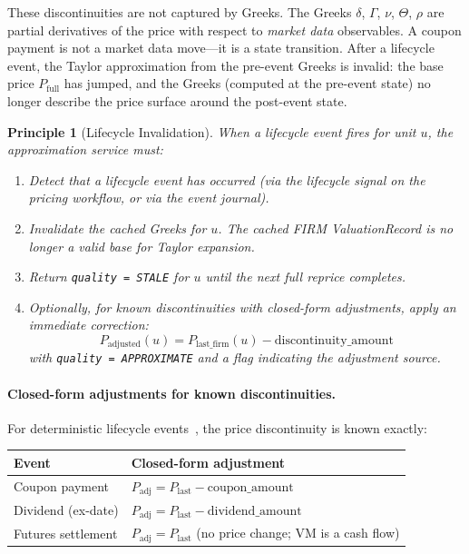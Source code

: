 \documentclass[11pt,a4paper]{article}
\newtheorem{principle}[definition]{Principle}
\begin{document}
\noindent These discontinuities are not captured by Greeks.  The Greeks $\delta$, $\Gamma$, $\nu$, $\Theta$, $\rho$ are partial derivatives of the price with respect to \emph{market data} observables.  A coupon payment is not a market data move---it is a state transition.  After a lifecycle event, the Taylor approximation from the pre-event Greeks is invalid: the base price $P_{\mathrm{full}}$ has jumped, and the Greeks (computed at the pre-event state) no longer describe the price surface around the post-event state.

\begin{principle}[Lifecycle Invalidation]
\label{princ:lifecycle-invalidation}
When a lifecycle event fires for unit $u$, the approximation service must:
\begin{enumerate}[nosep]
\item Detect that a lifecycle event has occurred (via the lifecycle signal on the pricing workflow, or via the event journal).
\item Invalidate the cached Greeks for $u$.  The cached FIRM ValuationRecord is no longer a valid base for Taylor expansion.
\item Return \texttt{quality = STALE} for $u$ until the next full reprice completes.
\item Optionally, for known discontinuities with closed-form adjustments, apply an immediate correction:
\[
P_{\mathrm{adjusted}}(u) = P_{\mathrm{last\_firm}}(u) - \mathrm{discontinuity\_amount}
\]
with \texttt{quality = APPROXIMATE} and a flag indicating the adjustment source.
\end{enumerate}
\end{principle}

\paragraph{Closed-form adjustments for known discontinuities.}  For deterministic lifecycle events~\cite[\S1.2, Property~5]{ledger}, the price discontinuity is known exactly:

\begin{center}
\small
\begin{tabular}{l l}
\toprule
\textbf{Event} & \textbf{Closed-form adjustment} \\
\midrule
Coupon payment & $P_{\mathrm{adj}} = P_{\mathrm{last}} - \mathrm{coupon\_amount}$ \\
Dividend (ex-date) & $P_{\mathrm{adj}} = P_{\mathrm{last}} - \mathrm{dividend\_amount}$ \\
Futures settlement & $P_{\mathrm{adj}} = P_{\mathrm{last}}$ (no price change; VM is a cash flow) \\
\bottomrule
\end{tabular}
\end{center}
\end{document}
